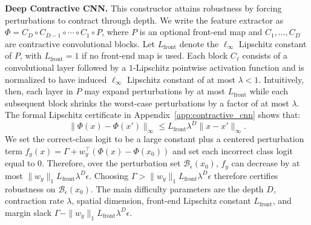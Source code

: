 \documentclass{article}
\theoremstyle{definition}
\begin{document}
\textbf{Deep Contractive CNN.}
This constructor attains robustness by forcing perturbations to contract through depth. 
We write the feature extractor as $\Phi = C_D\circ C_{D-1}\circ\cdots\circ C_1\circ P$, where $P$ is an optional front-end map and $C_1,\dots,C_D$ are contractive convolutional blocks. 
Let $L_{\mathrm{front}}$ denote the %
$\ell_\infty$ Lipschitz constant of $P$, with $L_{\mathrm{front}}=1$ if no front-end map is used. 
Each block $C_\ell$ consists of a convolutional layer followed by a $1$-Lipschitz pointwise activation function and is normalized to have induced $\ell_\infty$ Lipschitz constant of at most $\lambda<1$. Intuitively, then, each layer in $P$ may expand perturbations by at most $L_{\mathrm{front}}$ while each subsequent block shrinks the worst-case perturbations by a factor of at most $\lambda$. 
The formal Lipschitz certificate in Appendix~\ref{app:contractive_cnn} shows that: 
\begin{equation}
    \|\Phi(x)-\Phi(x')\|_\infty
    \leq
    L_{\mathrm{front}}\lambda^D\|x-x'\|_\infty . 
\end{equation}
We set the correct-class logit to be a large constant plus a centered perturbation term $ f_y(x)=\Gamma+w_y^\top(\Phi(x)-\Phi(x_0))$ and set each incorrect class %
logit equal to $0$. Therefore, over the perturbation set $\mathcal B_\epsilon(x_0)$, $f_y$ can decrease by at most $\|w_y\|_1 L_{\mathrm{front}}\lambda^D\epsilon$. Choosing $\Gamma>\|w_y\|_1 L_{\mathrm{front}}\lambda^D\epsilon$ therefore certifies robustness on $\mathcal B_\epsilon(x_0)$. The main difficulty parameters are the depth $D$, contraction rate $\lambda$, spatial dimension, front-end Lipschitz constant $L_{\mathrm{front}}$, and margin slack $\Gamma-\|w_y\|_1 L_{\mathrm{front}}\lambda^D\epsilon$.
\end{document}

